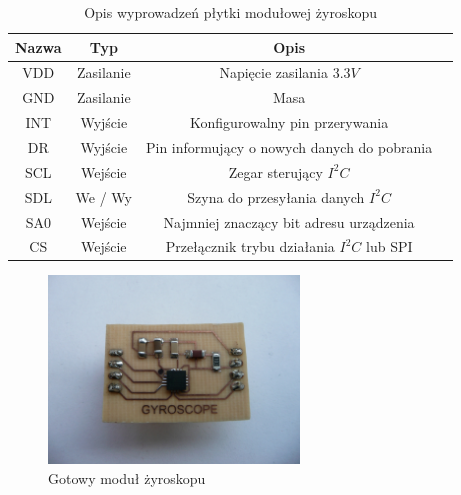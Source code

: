 \begin{table}[hb]
  \centering
  \caption{Opis wyprowadzeń płytki modułowej żyroskopu}
  \begin{tabular}{ | c | c | c | p{1.75cm} |} \hline
    Nazwa & Typ & Opis \\ \hline
    VDD & Zasilanie & Napięcie zasilania $3.3V$ \\
    GND & Zasilanie & Masa \\
    INT & Wyjście & Konfigurowalny pin przerywania \\
    DR  & Wyjście & Pin informujący o nowych danych do pobrania \\
    SCL & Wejście & Zegar sterujący $I^{2}C$ \\
    SDL & We / Wy & Szyna do przesyłania danych $I^{2}C$ \\
    SA0 & Wejście & Najmniej znaczący bit adresu urządzenia \\
    CS  & Wejście & Przełącznik trybu działania $I^{2}C$ lub SPI \\ \hline
  \end{tabular}
  \label{tab:L3G4200DModOut}
\end{table}

\begin{figure}[!ht]
 \centering
 \includegraphics[height=50mm]{../images/ch04/gyromodule.jpg}
 \caption{Gotowy moduł żyroskopu}
 \label{fig:L3G4200DModule}
\end{figure}